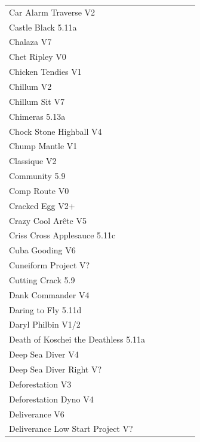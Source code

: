 \begin{flushleft}
\begin{center}
\begin{supertabular}{p{0.76\linewidth}p{0.08\linewidth}}
Car Alarm Traverse V2 & \pageref{rt:Car Alarm Traverse} \\
Castle Black 5.11a & \pageref{rt:Castle Black} \\
Chalaza V7 & \pageref{rt:RC_1} \\
Chet Ripley V0 & \pageref{rt:Chet Ripley} \\
Chicken Tendies V1 & \pageref{rt:Chicken Tendies} \\
Chillum V2 & \pageref{rt:Chillum} \\
Chillum Sit V7 & \pageref{vr:Chillum Sit} \\
Chimeras 5.13a & \pageref{rt:Chimeras} \\
Chock Stone Highball V4 & \pageref{rt:Chock Stone Highball} \\
Chump Mantle V1 & \pageref{rt:Chump Mantle} \\
Classique V2 & \pageref{rt:Classique} \\
Community 5.9 & \pageref{rt:Community} \\
Comp Route V0 & \pageref{rt:Comp Route} \\
Cracked Egg V2+ & \pageref{rt:Cracked Egg} \\
Crazy Cool Arête V5 & \pageref{rt:Crazy Cool Arête} \\
Criss Cross Applesauce 5.11c & \pageref{rt:Criss Cross Applesauce} \\
Cuba Gooding V6 & \pageref{rt:Cuba Gooding} \\
Cuneiform Project V? & \pageref{rt:Cuneiform Project} \\
Cutting Crack 5.9 & \pageref{rt:Cutting Crack} \\
Dank Commander V4 & \pageref{rt:Dank Commander} \\
Daring to Fly 5.11d & \pageref{rt:Daring to Fly} \\
Daryl Philbin V1/2 & \pageref{rt:Daryl Philbin} \\
Death of Koschei the Deathless 5.11a & \pageref{rt:Death of Koschei the Deathless} \\
Deep Sea Diver V4 & \pageref{rt:Deep Sea Diver} \\
Deep Sea Diver Right V? & \pageref{rt:DSD 4} \\
Deforestation V3 & \pageref{rt:Deforestation} \\
Deforestation Dyno V4 & \pageref{vr:Deforestation Dyno} \\
Deliverance V6 & \pageref{rt:Deliverance} \\
Deliverance Low Start Project V? & \pageref{vr:Deliverance Low} \\

\end{supertabular}
\end{center}
\end{flushleft}
